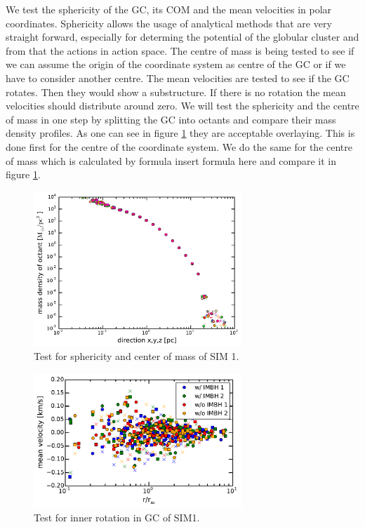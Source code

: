 \par We test the sphericity of the \ac{GC}, its \ac{COM} and the mean velocities in polar coordinates. Sphericity allows the usage of analytical methods that are very straight forward, especially for determing the potential of the globular cluster and from that the actions in action space. The centre of mass is being tested to see if we can assume the origin of the coordinate system as centre of the \ac{GC} or if we have to consider another centre. The mean velocities are tested to see if the \ac{GC} rotates. Then they would show a substructure. If there is no rotation the mean velocities should distribute around zero.
We will test the sphericity and the centre of mass in one step by splitting the \ac{GC} into octants and compare their mass density profiles. As one can see in figure \ref{fig:sphericity_com} they are acceptable overlaying. This is done first for the centre of the coordinate system. We do the same for the centre of mass which is calculated by formula \color{red} insert formula here \color{black} and compare it in figure \ref{fig:sphericity_com}.
\begin{figure}[htbp]
\centering
\includegraphics[width=0.7\textwidth]{Plots/sphericity_com.pdf}
\caption{Test for sphericity and center of mass of SIM 1.}
\label{fig:sphericity_com}
\end{figure}

\begin{figure}[htbp]
\centering
\includegraphics[width=0.7\textwidth]{Plots/mean_velocity.pdf}
\caption{Test for inner rotation in \ac{GC} of SIM1.}
\label{fig:mean_vel}
\end{figure}

